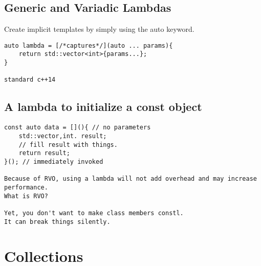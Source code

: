 \subsection{Generic and Variadic Lambdas}

Create implicit templates by simply using the auto keyword.

\begin{verbatim}
auto lambda = [/*captures*/](auto ... params){
    return std::vector<int>{params...};
}

standard c++14
\end{verbatim}

\subsection{A lambda to initialize a const object}

\begin{verbatim}
const auto data = [](){ // no parameters
    std::vector,int. result;
    // fill result with things. 
    return result;
}(); // immediately invoked

Because of RVO, using a lambda will not add overhead and may increase performance.
What is RVO?

Yet, you don't want to make class members constl.
It can break things silently. 
\end{verbatim}

\section{Collections}

